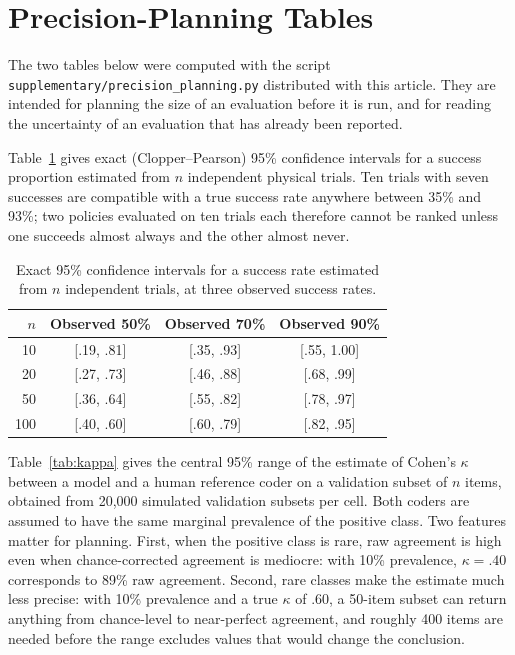 \section{Precision-Planning Tables}
\label{app:precision}

The two tables below were computed with the script
\texttt{supplementary/precision\_planning.py} distributed with this article.
They are intended for planning the size of an evaluation before it is run, and
for reading the uncertainty of an evaluation that has already been reported.

Table~\ref{tab:cp} gives exact (Clopper--Pearson) 95\% confidence intervals
for a success proportion estimated from $n$ independent physical trials. Ten
trials with seven successes are compatible with a true success rate anywhere
between 35\% and 93\%; two policies evaluated on ten trials each therefore
cannot be ranked unless one succeeds almost always and the other almost never.

\begin{table}[!ht]
\caption{Exact 95\% confidence intervals for a success rate estimated from $n$
independent trials, at three observed success rates.}
\label{tab:cp}
\begin{tabular}{rccc}
\toprule
$n$ & Observed 50\% & Observed 70\% & Observed 90\% \\
\midrule
10  & [.19, .81] & [.35, .93] & [.55, 1.00] \\
20  & [.27, .73] & [.46, .88] & [.68, .99] \\
50  & [.36, .64] & [.55, .82] & [.78, .97] \\
100 & [.40, .60] & [.60, .79] & [.82, .95] \\
\bottomrule
\end{tabular}
\end{table}

Table~\ref{tab:kappa} gives the central 95\% range of the estimate of Cohen's
$\kappa$ between a model and a human reference coder on a validation subset of
$n$ items, obtained from 20{,}000 simulated validation subsets per cell. Both
coders are assumed to have the same marginal prevalence of the positive class.
Two features matter for planning. First, when the positive class is rare, raw
agreement is high even when chance-corrected agreement is mediocre: with 10\%
prevalence, $\kappa=.40$ corresponds to 89\% raw agreement. Second, rare
classes make the estimate much less precise: with 10\% prevalence and a true
$\kappa$ of .60, a 50-item subset can return anything from chance-level to
near-perfect agreement, and roughly 400 items are needed before the range
excludes values that would change the conclusion.

